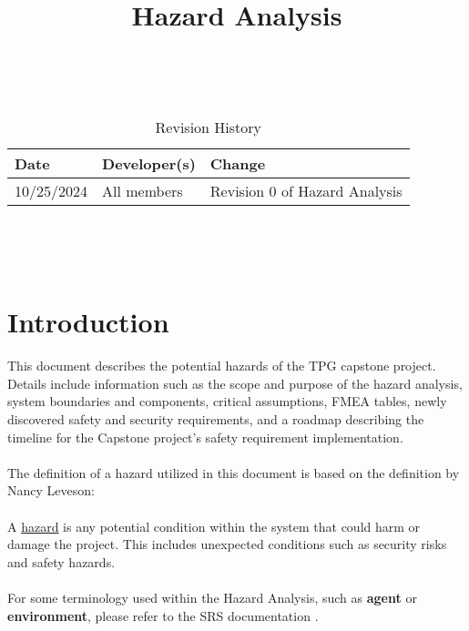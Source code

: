 \documentclass{article}
\title{Hazard Analysis\\\progname}
\author{\authname}
\date{}
\begin{document}
\maketitle
\thispagestyle{empty}

~\newpage


\begin{table}[hp]
\caption{Revision History} \label{TblRevisionHistory}
\begin{tabularx}{\textwidth}{llX}
\toprule
\textbf{Date} & \textbf{Developer(s)} & \textbf{Change}\\
\midrule
10/25/2024 & All members & Revision 0 of Hazard Analysis\\
\bottomrule
\end{tabularx}
\end{table}

~\newpage

\tableofcontents

~\newpage



\section{Introduction}


This document describes the potential hazards of the TPG capstone project. Details include information such as the scope and purpose of the hazard analysis, system boundaries and components, critical assumptions, FMEA tables, newly discovered safety and security requirements, and a roadmap describing the timeline for the Capstone project’s safety requirement implementation. 
\\\\
The definition of a hazard utilized in this document is based on the definition by Nancy Leveson: 
\\\\
A \underline{hazard} is any potential condition within the system that could harm or damage the project. This includes unexpected conditions such as security risks and safety hazards. 
\\\\
For some terminology used within the Hazard Analysis, such as \textbf{agent} or \textbf{environment}, please refer to the SRS documentation \citep{SRS}.
\end{document}
